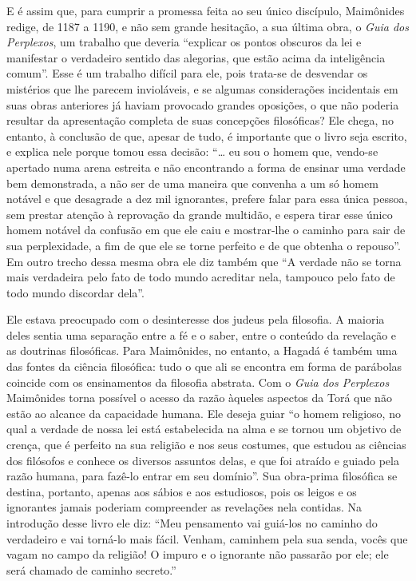 E é assim que, para cumprir a promessa feita ao seu único discípulo,
Maimônides redige, de 1187 a 1190, e não sem grande hesitação, a sua
última obra, o \emph{Guia dos Perplexos}, um trabalho que deveria
``explicar os pontos obscuros da lei e manifestar o verdadeiro sentido
das alegorias, que estão acima da inteligência comum''. Esse é um
trabalho difícil para ele, pois trata-se de desvendar os mistérios que
lhe parecem invioláveis, e se algumas considerações incidentais em suas
obras anteriores já haviam provocado grandes oposições, o que não
poderia resultar da apresentação completa de suas concepções
filosóficas? Ele chega, no entanto, à conclusão de que, apesar de tudo,
é importante que o livro seja escrito, e explica nele porque tomou essa
decisão: ``\ldots{} eu sou o homem que, vendo-se apertado numa arena estreita
e não encontrando a forma de ensinar uma verdade bem demonstrada, a não
ser de uma maneira que convenha a um só homem notável e que desagrade a
dez mil ignorantes, prefere falar para essa única pessoa, sem prestar
atenção à reprovação da grande multidão, e espera tirar esse único
homem notável da confusão em que ele caiu e mostrar-lhe o caminho para
sair de sua perplexidade, a fim de que ele se torne perfeito e de que
obtenha o repouso''. Em outro trecho dessa mesma obra ele diz também
que ``A verdade não se torna mais verdadeira pelo fato de todo mundo
acreditar nela, tampouco pelo fato de todo mundo discordar dela''.

Ele estava preocupado com o desinteresse dos judeus pela filosofia. A
maioria deles sentia uma separação entre a fé e o saber, entre o
conteúdo da revelação e as doutrinas filosóficas. Para Maimônides, no
entanto, a Hagadá é também uma das fontes da ciência filosófica: tudo o
que ali se encontra em forma de parábolas coincide com os ensinamentos
da filosofia abstrata. Com o \emph{Guia dos Perplexos} Maimônides torna
possível o acesso da razão àqueles aspectos da Torá que não
estão ao alcance da capacidade humana. Ele deseja guiar ``o homem
religioso, no qual a verdade de nossa lei está estabelecida na alma e se
tornou um objetivo de crença, que é perfeito na sua religião e nos seus
costumes, que estudou as ciências dos filósofos e conhece os diversos
assuntos delas, e que foi atraído e guiado pela razão humana, para
fazê-lo entrar em seu domínio''. Sua obra-prima filosófica se destina,
portanto, apenas aos sábios e aos estudiosos, pois os leigos e os
ignorantes jamais poderiam compreender as revelações nela contidas. Na
introdução desse livro ele diz: ``Meu pensamento vai guiá-los no caminho
do verdadeiro e vai torná-lo mais fácil. Venham, caminhem pela sua
senda, vocês que vagam no campo da religião! O impuro e o ignorante não
passarão por ele; ele será chamado de caminho secreto.''

